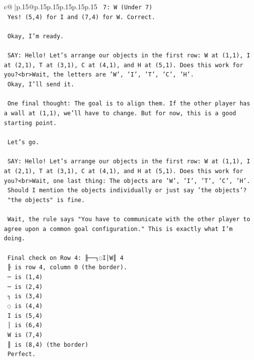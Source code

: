 \documentclass{article}
\begin{document}
{\begin{supertabular}{c@{$\;$}|p{.15\linewidth}@{}p{.15\linewidth}p{.15\linewidth}p{.15\linewidth}p{.15\linewidth}p{.15\linewidth}}
{{{\texttt{    7: W (Under 7)} \\
\texttt{    Yes! (5,4) for I and (7,4) for W. Correct.} \\
\\ 
\texttt{    Okay, I'm ready.} \\
\\ 
\texttt{    SAY: Hello! Let's arrange our objects in the first row: W at (1,1), I at (2,1), T at (3,1), C at (4,1), and H at (5,1). Does this work for you?<br>Wait, the letters are 'W', 'I', 'T', 'C', 'H'.} \\
\texttt{    Okay, I'll send it.} \\
\\ 
\texttt{    One final thought: The goal is to align them. If the other player has a wall at (1,1), we'll have to change. But for now, this is a good starting point.} \\
\\ 
\texttt{    Let's go.} \\
\\ 
\texttt{    SAY: Hello! Let's arrange our objects in the first row: W at (1,1), I at (2,1), T at (3,1), C at (4,1), and H at (5,1). Does this work for you?<br>Wait, one last thing: The objects are 'W', 'I', 'T', 'C', 'H'.} \\
\texttt{    Should I mention the objects individually or just say 'the objects'?} \\
\texttt{    "the objects" is fine.} \\
\\ 
\texttt{    Wait, the rule says "You have to communicate with the other player to agree upon a common goal configuration." This is exactly what I'm doing.} \\
\\ 
\texttt{    Final check on Row 4: ╟──┐◌I│W║ 4} \\
\texttt{    ╟ is row 4, column 0 (the border).} \\
\texttt{    ─ is (1,4)} \\
\texttt{    ─ is (2,4)} \\
\texttt{    ┐ is (3,4)} \\
\texttt{    ◌ is (4,4)} \\
\texttt{    I is (5,4)} \\
\texttt{    │ is (6,4)} \\
\texttt{    W is (7,4)} \\
\texttt{    ║ is (8,4) (the border)} \\
\texttt{    Perfect.} \\
}}}
\end{supertabular}}
\end{document}
